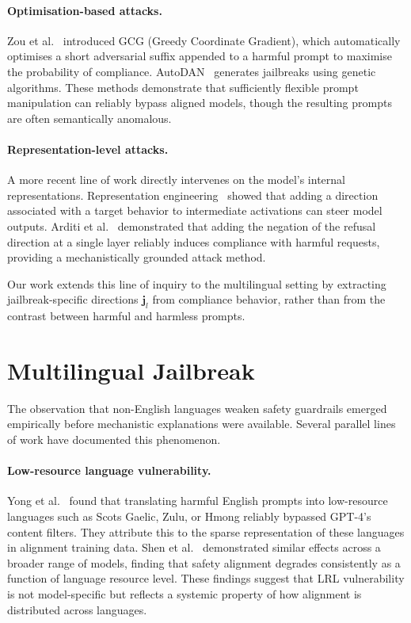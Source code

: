 \paragraph{Optimisation-based attacks.} Zou et al.~\citeyearpar{zou2023gcg} introduced GCG (Greedy Coordinate Gradient), which automatically optimises a short adversarial suffix appended to a harmful prompt to maximise the probability of compliance. AutoDAN~\citep{liu2023autodan} generates jailbreaks using genetic algorithms. These methods demonstrate that sufficiently flexible prompt manipulation can reliably bypass aligned models, though the resulting prompts are often semantically anomalous.

\paragraph{Representation-level attacks.} A more recent line of work directly intervenes on the model's internal representations. Representation engineering~\citep{zou2023representation} showed that adding a direction associated with a target behavior to intermediate activations can steer model outputs. Arditi et al.~\citeyearpar{arditi2024refusal} demonstrated that adding the negation of the refusal direction at a single layer reliably induces compliance with harmful requests, providing a mechanistically grounded attack method.

Our work extends this line of inquiry to the multilingual setting by extracting jailbreak-specific directions $\mathbf{j}_l$ from compliance behavior, rather than from the contrast between harmful and harmless prompts.

\section{Multilingual Jailbreak}
\label{sec:multilingual_jailbreak}

The observation that non-English languages weaken safety guardrails emerged empirically before mechanistic explanations were available. Several parallel lines of work have documented this phenomenon.

\paragraph{Low-resource language vulnerability.}
Yong et al.~\citeyearpar{yong2023lowresource} found that translating harmful English prompts into low-resource languages such as Scots Gaelic, Zulu, or Hmong reliably bypassed GPT-4's content filters. They attribute this to the sparse representation of these languages in alignment training data. Shen et al.~\citeyearpar{shen2024language} demonstrated similar effects across a broader range of models, finding that safety alignment degrades consistently as a function of language resource level. These findings suggest that LRL vulnerability is not model-specific but reflects a systemic property of how alignment is distributed across languages.

